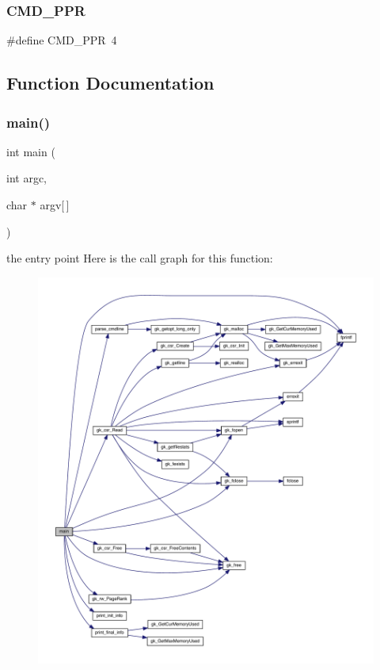 \subsubsection{\texorpdfstring{C\+M\+D\+\_\+\+P\+PR}{CMD\_PPR}}
{\footnotesize\ttfamily \#define C\+M\+D\+\_\+\+P\+PR~4}



\subsection{Function Documentation}
\mbox{\label{a00864_a0ddf1224851353fc92bfbff6f499fa97}} 
\subsubsection{\texorpdfstring{main()}{main()}}
{\footnotesize\ttfamily int main (\begin{DoxyParamCaption}\item[{int}]{argc,  }\item[{char $\ast$}]{argv\mbox{[}$\,$\mbox{]} }\end{DoxyParamCaption})}

the entry point Here is the call graph for this function\+:\nopagebreak
\begin{figure}[H]
\begin{center}
\leavevmode
\includegraphics[width=350pt]{a00864_a0ddf1224851353fc92bfbff6f499fa97_cgraph}
\end{center}
\end{figure}
\mbox{\label{a00864_a0e7ce196a2f8882777957bf898739f6f}} 

